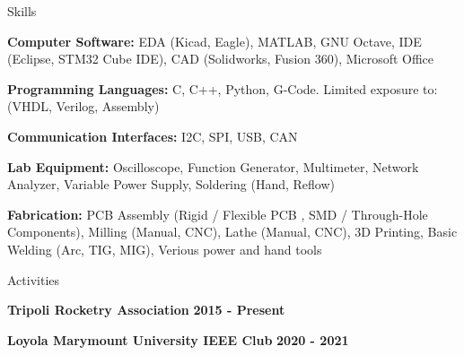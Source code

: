 \documentclass{resume} %
\begin{document}
	\begin{rSection}{Skills} \itemsep -2pt						
		\item \textbf{Computer Software:} EDA (Kicad, Eagle), MATLAB, GNU Octave, IDE (Eclipse, STM32 Cube IDE), CAD (Solidworks, Fusion 360), Microsoft Office	
		\item \textbf{Programming Languages:} C, C++, Python, G-Code. Limited exposure to: (VHDL, Verilog, Assembly)
		\item \textbf{Communication Interfaces:} I2C, SPI, USB, CAN				
		\item \textbf{Lab Equipment:} Oscilloscope, Function Generator, Multimeter, Network Analyzer, Variable Power Supply, Soldering (Hand, Reflow)		
		\item \textbf{Fabrication:} PCB Assembly (Rigid / Flexible PCB , SMD / Through-Hole Components), Milling (Manual, CNC), Lathe (Manual, CNC), 3D Printing, Basic Welding (Arc, TIG, MIG), Verious power and hand tools
	\end{rSection}
	
	\begin{rSection}{Activities} \itemsep -2pt
		\item \textbf{Tripoli Rocketry Association} \hfill{\bf 2015 - Present}
		\item \textbf{Loyola Marymount University IEEE Club} \hfill{\bf 2020 - 2021}
	\end{rSection}
	
\end{document}
